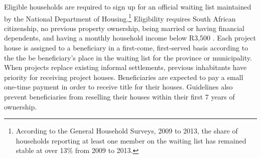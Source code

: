 \documentclass[12pt]{article}
\begin{document}



Eligible households are required to sign up for an official waiting list maintained by the National Department of Housing.\footnote{According to the General Household Surveys, 2009 to 2013, the share of households reporting at least one member on the waiting list has remained stable at over 13\% from 2009 to 2013.}  Eligibility requires South African citizenship, no previous property ownership, being married or having financial dependents, and having a monthly household income below R3,500 \citep{seriq}.  Each project house is assigned to a beneficiary in a first-come, first-served basis according to the the be beneficiary's place in the waiting list for the province or municipality. When projects replace existing informal settlements, previous inhabitants have priority for receiving project houses.  Beneficiaries are expected to pay a small one-time payment in order to receive title for their houses.  Guidelines also prevent beneficiaries from reselling their houses within their first 7 years of ownership.   %
\end{document}

